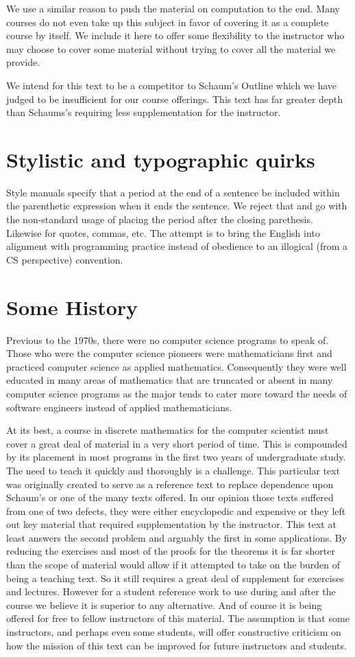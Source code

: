 We use a similar reason to push the material on computation to the end. Many courses do not even take up this subject in favor of covering it as a complete course by itself. We include it here to offer some flexibility to the instructor who may choose to cover some material without trying to cover all the material we provide. 

We intend for this text to be a competitor to Schaum's Outline which we have judged to be insufficient for our course offerings. This text has far greater depth than Schaums's requiring less supplementation for the instructor. 

\section* {Stylistic and typographic quirks}
Style manuals specify that a period at the end of a sentence be included within the parenthetic expression when it ends the sentence. We reject that and go with the non-standard usage of placing the period after the closing parethesis. Likewise for quotes, commas, etc. The attempt is to bring the English into alignment with programming practice instead of obedience to an illogical (from a CS perspective) convention.

\section*{Some History}
Previous to the 1970s, there were no computer science programs to speak of. Those who were the computer science pioneers were mathematicians first and practiced computer science as applied mathematics. Consequently they were well educated in many areas of mathematics that are truncated or absent in many computer science programs as the major tends to cater more toward the needs of software engineers instead of applied mathematicians. 

At its best, a course in discrete mathematics for the computer scientist must cover a great deal of material in a very short period of time. This is compounded by its placement in most programs in the first two years of undergraduate study. The need to teach it quickly and thoroughly is a challenge. This particular text was originally created to serve as a reference text to replace dependence upon Schaum's or one of the many texts offered. In our opinion those texts suffered from one of two defects, they were either encyclopedic and expensive or they left out key material that required supplementation by the instructor. This text at least answers the second problem and arguably the first in some applications. By reducing the exercises and most of the proofs for the theorems it is far shorter than the scope of material would allow if it attempted to take on the burden of being a teaching text. So it still requires a great deal of supplement for exercises and lectures. However for a student reference work to use during and after the course we believe it is superior to any alternative. And of course it is being offered for free to fellow instructors of this material. The assumption is that some instructors, and perhaps even some students, will offer constructive criticism on how the mission of this text can be improved for future instructors and students.

